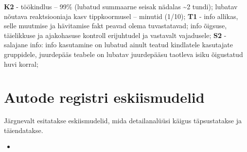 \begin{longtabu}
	\textbf{K2} - töökindlus – 99\%  (lubatud summaarne seisak nädalas \textasciitilde2 tundi); lubatav nõutava reaktsiooniaja kasv tippkoormusel – minutid (1/10);
	\textbf{T1} -  info allikas, selle muutmise ja hävitamise fakt peavad olema tuvastatavad; info õigsuse, täielikkuse ja ajakohasuse kontroll erijuhtudel ja vastavalt vajadusele;
	\textbf{S2} - salajane info: info kasutamine on lubatud ainult teatud kindlatele kasutajate gruppidele, juurdepääs teabele on lubatav juurdepääsu taotleva isiku õigustatud huvi korral;
	\\ \hline	
\end{longtabu}

\section{Autode registri eskiismudelid }
Järgnevalt esitatakse eskiismudelid, mida detailanalüüsi käigus täpsustatakse ja täiendatakse.

\begin{itemize}
	\item 
\end{itemize}